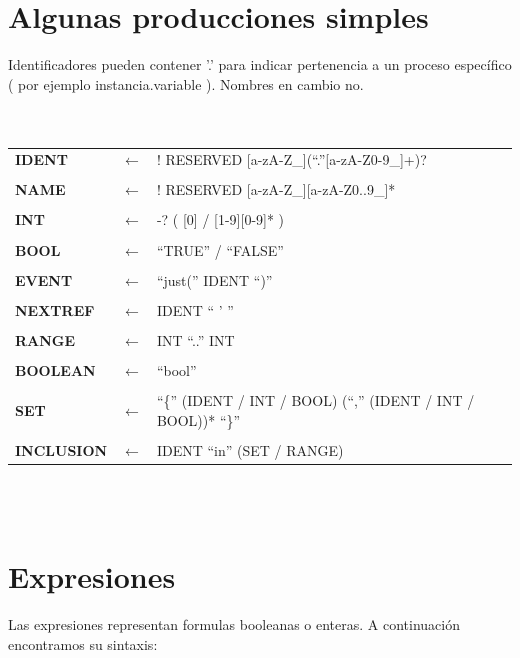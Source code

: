 \documentclass[titlepage, 12pt]{book}
\begin{document}


\section{Algunas producciones simples}

Identificadores pueden contener '.' para indicar pertenencia a un proceso específico ( por ejemplo instancia.variable ). Nombres en cambio no.\\

~\\\\
\begin{tabularx}{\textwidth}{>{\bfseries}llX}
IDENT & $\longleftarrow$ & ! RESERVED [a-zA-Z\_](``.''[a-zA-Z0-9\_]+)?\\\\
NAME & $\longleftarrow$ & ! RESERVED [a-zA-Z\_][a-zA-Z0..9\_]*\\\\
INT & $\longleftarrow$ & -? ( [0] / [1-9][0-9]* )\\\\
BOOL & $\longleftarrow$ & ``TRUE'' / ``FALSE''\\\\
EVENT & $\longleftarrow$ & ``just('' IDENT ``)''\\\\
NEXTREF & $\longleftarrow$ & IDENT `` ' ''\\\\
RANGE & $\longleftarrow$ & INT ``..'' INT\\\\
BOOLEAN & $\longleftarrow$ & ``bool''\\\\
SET & $\longleftarrow$ & ``\{'' (IDENT / INT / BOOL) (``,'' (IDENT / INT / BOOL))* ``\}''\\\\
INCLUSION & $\longleftarrow$ & IDENT ``in'' (SET / RANGE)\\
\end{tabularx}
~\\\\

\section{Expresiones}
Las expresiones representan formulas booleanas o enteras. A continuación encontramos su sintaxis:
\end{document}
